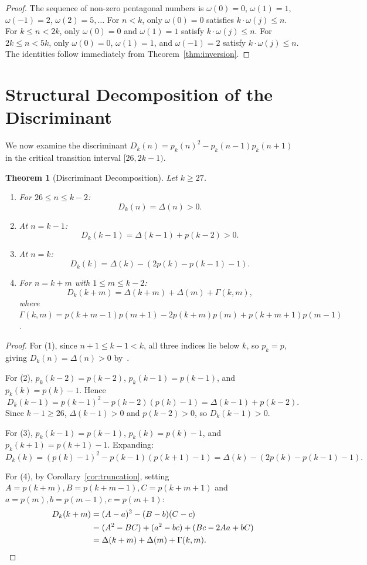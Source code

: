 \documentclass[11pt,reqno]{amsart}
\newtheorem{theorem}{Theorem}[section]
\theoremstyle{definition}
\numberwithin{equation}{section}
\begin{document}
\begin{proof}
The sequence of non-zero pentagonal numbers is $\omega(0) = 0$, $\omega(1) = 1$, $\omega(-1) = 2$, $\omega(2) = 5, \dots$
For $n < k$, only $\omega(0) = 0$ satisfies $k \cdot \omega(j) \le n$.
For $k \le n < 2k$, only $\omega(0) = 0$ and $\omega(1) = 1$ satisfy $k \cdot \omega(j) \le n$.
For $2k \le n < 5k$, only $\omega(0) = 0$, $\omega(1) = 1$, and $\omega(-1) = 2$ satisfy $k \cdot \omega(j) \le n$.
The identities follow immediately from Theorem~\ref{thm:inversion}.
\end{proof}

\section{Structural Decomposition of the Discriminant}

We now examine the discriminant $D_k(n) = p_k(n)^2 - p_k(n-1) p_k(n+1)$ in the critical transition interval $[26, 2k-1)$.

\begin{theorem}[Discriminant Decomposition]\label{thm:decomp}
Let $k \ge 27$.
\begin{enumerate}
\item For $26 \le n \le k-2$:
\[
D_k(n) = \Delta(n) > 0.
\]
\item At $n = k-1$:
\[
D_k(k-1) = \Delta(k-1) + p(k-2) > 0.
\]
\item At $n = k$:
\[
D_k(k) = \Delta(k) - (2p(k) - p(k-1) - 1).
\]
\item For $n = k+m$ with $1 \le m \le k-2$:
\[
D_k(k+m) = \Delta(k+m) + \Delta(m) + \Gamma(k, m),
\]
where $\Gamma(k, m) = p(k+m-1) p(m+1) - 2 p(k+m) p(m) + p(k+m+1) p(m-1)$.
\end{enumerate}
\end{theorem}

\begin{proof}
For (1), since $n+1 \le k-1 < k$, all three indices lie below $k$, so $p_k = p$, giving $D_k(n) = \Delta(n) > 0$ by~\cite{DeSalvoPak2015}.

For (2), $p_k(k-2) = p(k-2)$, $p_k(k-1) = p(k-1)$, and $p_k(k) = p(k) - 1$. Hence
\[
D_k(k-1) = p(k-1)^2 - p(k-2)(p(k) - 1) = \Delta(k-1) + p(k-2).
\]
Since $k-1 \ge 26$, $\Delta(k-1) > 0$ and $p(k-2) > 0$, so $D_k(k-1) > 0$.

For (3), $p_k(k-1) = p(k-1)$, $p_k(k) = p(k) - 1$, and $p_k(k+1) = p(k+1) - 1$. Expanding:
\[
D_k(k) = (p(k) - 1)^2 - p(k-1)(p(k+1) - 1) = \Delta(k) - (2p(k) - p(k-1) - 1).
\]

For (4), by Corollary~\ref{cor:truncation}, setting $A = p(k+m), B = p(k+m-1), C = p(k+m+1)$ and $a = p(m), b = p(m-1), c = p(m+1)$:
\begin{align*}
D_k(k+m) &= (A - a)^2 - (B - b)(C - c) \\
&= (A^2 - BC) + (a^2 - bc) + (Bc - 2Aa + bC) \\
&= \Delta(k+m) + \Delta(m) + \Gamma(k, m). \qedhere
\end{align*}
\end{proof}
\end{document}
